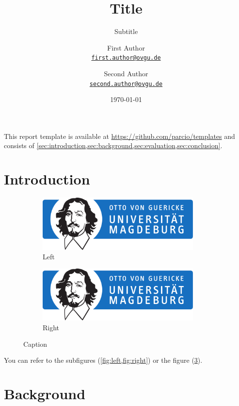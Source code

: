 \documentclass[
    12pt,
    a4paper,
    parskip=half,
]{scrartcl}
\title{Title}
\subtitle{Subtitle}
\author{
First Author\\
{\large\href{mailto:first.author@ovgu.de}{\nolinkurl{first.author@ovgu.de}}}
\and
Second Author\\
{\large\href{mailto:second.author@ovgu.de}{\nolinkurl{second.author@ovgu.de}}}
}
\date{\today}
\begin{document}
\maketitle

This report template is available at \url{https://github.com/parcio/templates} and consists of \cref{sec:introduction,sec:background,sec:evaluation,sec:conclusion}.

\section{Introduction}
\label{sec:introduction}

\begin{figure}[ht]
    \centering
    \begin{subfigure}{0.45\textwidth}
        \centering
        \includegraphics[width=0.9\textwidth]{OVGU-INF}
        \caption{Left}
        \label{fig:left}
    \end{subfigure}
    \begin{subfigure}{0.45\textwidth}
        \centering
        \includegraphics[width=0.9\textwidth]{OVGU-INF}
        \caption{Right}
        \label{fig:right}
    \end{subfigure}
    \caption{Caption}
    \label{fig:both}
\end{figure}

You can refer to the subfigures (\cref{fig:left,fig:right}) or the figure (\cref{fig:both}).

\section{Background}
\label{sec:background}
\end{document}
